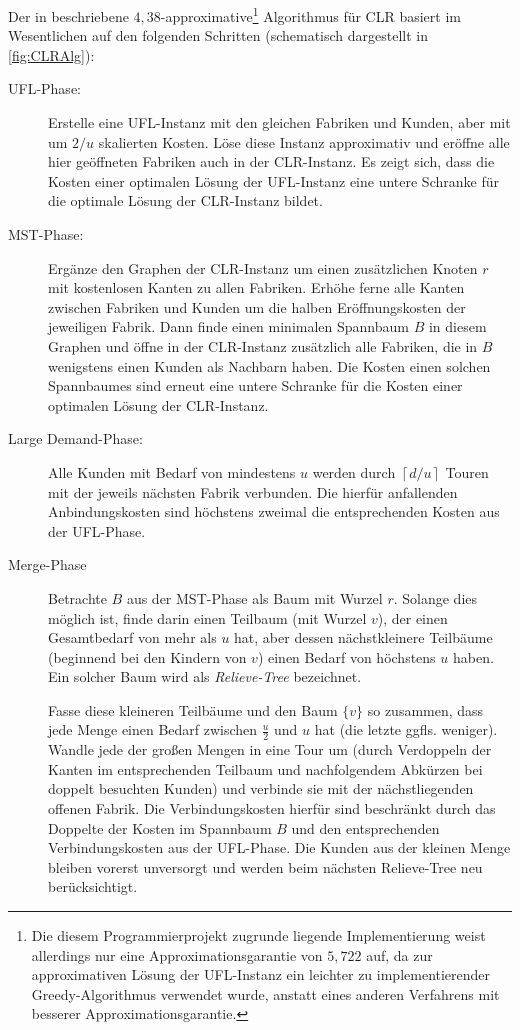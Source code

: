 \documentclass[a4paper,ngerman,11pt,bibtotoc]{scrartcl}
\theoremstyle{definition}
\theoremstyle{plain}
\theoremstyle{remark}
\newcommand{\ceil}[1]{\left\lceil#1\right\rceil}
\newcommand{\CLR}{CLR}
\newcommand{\MST}{MST}
\newcommand{\UFL}{UFL}
\begin{document}
Der in \cite{AAfCLR} beschriebene $4,38$-approximative\footnote{Die diesem Programmierprojekt zugrunde liegende Implementierung weist allerdings nur eine Approximationsgarantie von $5,722$ auf, da zur approximativen Lösung der \UFL-Instanz ein leichter zu implementierender Greedy-Algorithmus verwendet wurde, anstatt eines anderen Verfahrens mit besserer Approximationsgarantie.} Algorithmus für \CLR{} basiert im Wesentlichen auf den folgenden Schritten (schematisch dargestellt in \cref{fig:CLRAlg}):
\begin{description}
	\item[\UFL-Phase:] Erstelle eine \UFL-Instanz mit den gleichen Fabriken und Kunden, aber mit um $2/u$ skalierten Kosten. Löse diese Instanz approximativ und eröffne alle hier geöffneten Fabriken auch in der \CLR-Instanz. Es zeigt sich, dass die Kosten einer optimalen Lösung der \UFL-Instanz eine untere Schranke für die optimale Lösung der \CLR-Instanz bildet.
	\item[\MST-Phase:] Ergänze den Graphen der \CLR-Instanz um einen zusätzlichen Knoten $r$ mit kostenlosen Kanten zu allen Fabriken. Erhöhe ferne alle Kanten zwischen Fabriken und Kunden um die halben Eröffnungskosten der jeweiligen Fabrik. Dann finde einen minimalen Spannbaum $B$ in diesem Graphen und öffne in der \CLR-Instanz zusätzlich alle Fabriken, die in $B$ wenigstens einen Kunden als Nachbarn haben. Die Kosten einen solchen Spannbaumes sind erneut eine untere Schranke für die Kosten einer optimalen Lösung der \CLR-Instanz.
	\item[Large Demand-Phase:] Alle Kunden mit Bedarf von mindestens $u$ werden durch $\ceil{d/u}$ Touren mit der jeweils nächsten Fabrik verbunden. Die hierfür anfallenden Anbindungskosten sind höchstens zweimal die entsprechenden Kosten aus der \UFL-Phase.
	\item[Merge-Phase] Betrachte $B$ aus der \MST-Phase als Baum mit Wurzel $r$. Solange dies möglich ist, finde darin einen Teilbaum (mit Wurzel $v$), der einen Gesamtbedarf von mehr als $u$ hat, aber dessen nächstkleinere Teilbäume (beginnend bei den Kindern von $v$) einen Bedarf von höchstens $u$ haben. Ein solcher Baum wird als \emph{Relieve-Tree} bezeichnet.
	 
	Fasse diese kleineren Teilbäume und den \glqq Baum\grqq{} $\{v\}$ so zusammen, dass jede Menge einen Bedarf zwischen $\frac{u}{2}$ und $u$ hat (die letzte ggfls. weniger). Wandle jede der großen Mengen in eine Tour um (durch Verdoppeln der Kanten im entsprechenden Teilbaum und nachfolgendem Abkürzen bei doppelt besuchten Kunden) und verbinde sie mit der nächstliegenden offenen Fabrik. Die Verbindungskosten hierfür sind beschränkt durch das Doppelte der Kosten im Spannbaum $B$ und den entsprechenden Verbindungskosten aus der \UFL-Phase. Die Kunden aus der kleinen Menge bleiben vorerst unversorgt und werden beim nächsten Relieve-Tree neu berücksichtigt.
	

\end{description}
\end{document}
